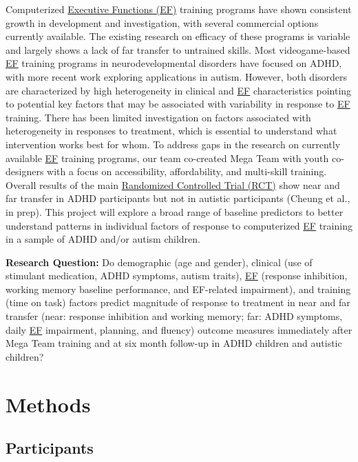 \documentclass[
  letterpaper,
]{ut-thesis}
\begin{document}
Computerized \hyperref[acronyms_EF]{Executive Functions (EF)} training
programs have shown consistent growth in development and investigation,
with several commercial options currently available. The existing
research on efficacy of these programs is variable and largely shows a
lack of far transfer to untrained skills. Most videogame-based
\hyperref[acronyms_EF]{EF} training programs in neurodevelopmental
disorders have focused on ADHD, with more recent work exploring
applications in autism. However, both disorders are characterized by
high heterogeneity in clinical and \hyperref[acronyms_EF]{EF}
characteristics pointing to potential key factors that may be associated
with variability in response to \hyperref[acronyms_EF]{EF} training.
There has been limited investigation on factors associated with
heterogeneity in responses to treatment, which is essential to
understand what intervention works best for whom. To address gaps in the
research on currently available \hyperref[acronyms_EF]{EF} training
programs, our team co-created Mega Team with youth co-designers with a
focus on accessibility, affordability, and multi-skill training. Overall
results of the main \hyperref[acronyms_RCT]{Randomized Controlled Trial
(RCT)} show near and far transfer in ADHD participants but not in
autistic participants (Cheung et al., in prep). This project will
explore a broad range of baseline predictors to better understand
patterns in individual factors of response to computerized
\hyperref[acronyms_EF]{EF} training in a sample of ADHD and/or autism
children.

\textbf{Research Question:} Do demographic (age and gender), clinical
(use of stimulant medication, ADHD symptoms, autism traits),
\hyperref[acronyms_EF]{EF} (response inhibition, working memory baseline
performance, and EF-related impairment), and training (time on task)
factors predict magnitude of response to treatment in near and far
transfer (near: response inhibition and working memory; far: ADHD
symptoms, daily \hyperref[acronyms_EF]{EF} impairment, planning, and
fluency) outcome measures immediately after Mega Team training and at
six month follow-up in ADHD children and autistic children?


\chapter{Methods}\label{methods}

\section{Participants}\label{participants}
\end{document}
